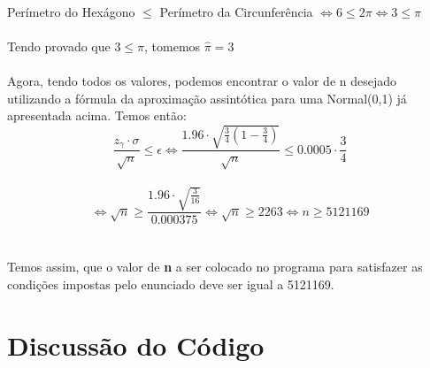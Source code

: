 \documentclass{article}
\begin{document}
    \\
    Perímetro do Hexágono $\leq$ Perímetro da Circunferência $\Leftrightarrow 6 \leq 2\pi \Leftrightarrow 3 \leq \pi$\\
    \\
    Tendo provado que $3 \leq \pi$, tomemos $\hat{\pi}=3$\\
    \\
    Agora, tendo todos os valores, podemos encontrar o valor de n desejado utilizando a fórmula da aproximação assintótica para uma Normal(0,1) já apresentada acima. Temos então:\\
    
    $$\frac{z_\gamma \cdot \sigma}{\sqrt{n}} \leq \epsilon \Leftrightarrow \frac{1.96 \cdot\sqrt{\frac{3}{4}(1-\frac{3}{4})}}{\sqrt{n}} \leq 0.0005\cdot\frac{3}{4}$$\\
    $$\Leftrightarrow \sqrt{n}\geq \frac{1.96\cdot\sqrt{\frac{3}{16}}}{0.000375}\Leftrightarrow \sqrt{n}\geq 2263 \Leftrightarrow n\geq 5121169$$\\
    \\
    Temos assim, que o valor de \textbf{n} a ser colocado no programa para satisfazer as condições impostas pelo enunciado deve ser igual a 5121169.

\section{Discussão do Código}
\end{document}
